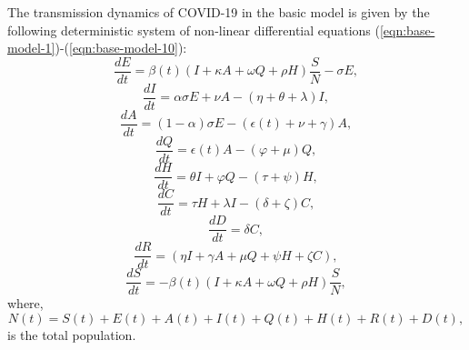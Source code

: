 \documentclass[10pt]{wlscirep}
\begin{document}
The transmission dynamics of COVID-19 in the basic model is given by the following deterministic system of non-linear differential equations (\ref{eqn:base-model-1})-(\ref{eqn:base-model-10}):
\begin{equation}
\frac{dE}{dt} = \beta(t) \left( I + \kappa A + \omega Q + \rho H \right) \frac{S}{N} - \sigma E, 
\label{eqn:base-model-1}
\end{equation}
\begin{equation}
\frac{dI}{dt} = \alpha \sigma E + \nu A - \left( \eta + \theta + \lambda \right) I,
\label{eqn:base-model-2}
\end{equation}
\begin{equation}
\frac{dA}{dt} =  \left( 1-\alpha \right) \sigma E - \left( \epsilon(t) + \nu + \gamma \right) A,
\label{eqn:base-model-3}
\end{equation}
\begin{equation}
\frac{dQ}{dt} = \epsilon(t) A - \left( \varphi + \mu \right) Q,
\label{eqn:base-model-4}
\end{equation}
\begin{equation}
\frac{dH}{dt} = \theta I + \varphi Q - \left( \tau + \psi \right) H ,
\label{eqn:base-model-5}
\end{equation}
\begin{equation}
\frac{dC}{dt} =  \tau H + \lambda I - \left( \delta + \zeta \right) C,
\label{eqn:base-model-6}
\end{equation}
\begin{equation}
\frac{dD}{dt} =  \delta C,
\label{eqn:base-model-7}
\end{equation}
\begin{equation}
\frac{dR}{dt} =  \left( \eta I +  \gamma A + \mu Q + \psi H + \zeta C \right),
\label{eqn:base-model-8}
\end{equation}
\begin{equation}
\frac{dS}{dt} = -\beta(t) \left( I + \kappa A + \omega Q + \rho H \right) \frac{S}{N},
\label{eqn:base-model-9}
\end{equation}
where,
\begin{equation}
N(t) = S(t) + E(t) + A(t) + I(t) + Q(t) + H(t) + R(t) + D(t),
\label{eqn:base-model-10}
\end{equation}
is the total population. 
\end{document}
